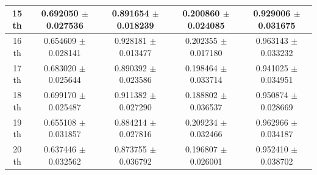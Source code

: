\begin{table}[h!]
\begin{tabular}[6pt]{c|c|c|c|c}
\hline
15 th & 0.692050 $\pm$ 0.027536 & 0.891654 $\pm$ 0.018239 & 0.200860 $\pm$ 0.024085 & 0.929006 $\pm$ 0.031675\\[3pt]
\hline
16 th & 0.654609 $\pm$ 0.028141 & 0.928181 $\pm$ 0.013477 & 0.202355 $\pm$ 0.017180 & 0.963143 $\pm$ 0.033232\\[3pt]
\hline
17 th & 0.683020 $\pm$ 0.025644 & 0.890392 $\pm$ 0.023586 & 0.198464 $\pm$ 0.033714 & 0.941025 $\pm$ 0.034951\\[3pt]
\hline
18 th & 0.699170 $\pm$ 0.025487 & 0.911382 $\pm$ 0.027290 & 0.188802 $\pm$ 0.036537 & 0.950874 $\pm$ 0.028669\\[3pt]
\hline
19 th & 0.655108 $\pm$ 0.031857 & 0.884214 $\pm$ 0.027816 & 0.209234 $\pm$ 0.032466 & 0.962966 $\pm$ 0.034187\\[3pt]
\hline
20 th & 0.637446 $\pm$ 0.032562 & 0.873755 $\pm$ 0.036792 & 0.196807 $\pm$ 0.026001 & 0.952410 $\pm$ 0.038702\\[3pt]
\hline
\end{tabular}

\bigskip

\caption{}


\end{table}



